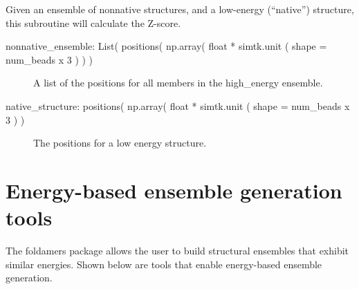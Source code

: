 \documentclass[letterpaper,12pt,english,openany,oneside]{sphinxmanual}
\begin{document}

\begin{fulllineitems}
\label{\detokenize{ensembles:ensembles.ens_build.get_nonnative_ensemble}}
\end{fulllineitems}


\begin{fulllineitems}
\label{\detokenize{ensembles:ensembles.ens_build.z_score}}
Given an ensemble of nonnative structures, and a low-energy (“native”) structure, this subroutine will calculate the Z-score.
\begin{description}
\item[{nonnative\_ensemble: List( positions( np.array( float * simtk.unit ( shape = num\_beads x 3 ) ) )}] \leavevmode
A list of the positions for all members in the high\_energy ensemble.

\item[{native\_structure: positions( np.array( float * simtk.unit ( shape = num\_beads x 3 ) )}] \leavevmode
The positions for a low energy structure.

\end{description}

\end{fulllineitems}



\section{Energy-based ensemble generation tools}
\label{\detokenize{ensembles:energy-based-ensemble-generation-tools}}
The foldamers package allows the user to build structural ensembles that exhibit similar energies.  Shown below are tools that enable energy-based ensemble generation.
\end{document}
